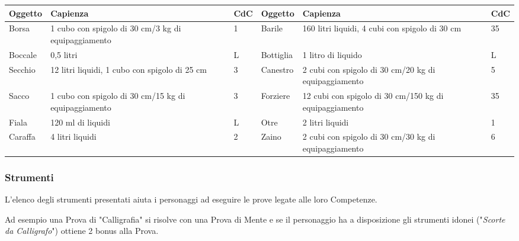 \documentclass[12pt,a4paper,twoside,openany]{book}
\begin{document}
\begin{tabularx}{0.95\textwidth}{lXl|lXl}
\textbf{Oggetto}&\textbf{Capienza}&\textbf{CdC}&\textbf{Oggetto}&\textbf{Capienza}&\textbf{CdC}\\
\toprule
Borsa&1 cubo con spigolo di 30 cm/3 kg di equipaggiamento&1&Barile&160 litri liquidi, 4 cubi con spigolo di 30 cm&35\\
Boccale&0,5 litri&L&Bottiglia&1 litro di liquido&L\\
Secchio&12 litri liquidi, 1 cubo con spigolo di 25 cm&3&Canestro&2 cubi con spigolo di 30 cm/20 kg di equipaggiamento&5\\
Sacco&1 cubo con spigolo di 30 cm/15 kg di equipaggiamento&3&Forziere&12 cubi con spigolo di 30 cm/150 kg di equipaggiamento&35\\
Fiala&120 ml di liquidi&L&Otre&2 litri liquidi&1\\
Caraffa&4 litri liquidi&2&Zaino&2 cubi con spigolo di 30 cm/30 kg di equipaggiamento&6\\
\end{tabularx}


\begin{multicols}{2}

\subsubsection{Strumenti}

L'elenco degli strumenti presentati aiuta i personaggi ad eseguire le prove legate alle loro Competenze.

Ad esempio una Prova di "Calligrafia" si risolve con una Prova di Mente e se il personaggio ha a disposizione gli strumenti idonei ("\textit{Scorte da Calligrafo}") ottiene 2 bonus alla Prova.

\end{multicols}

\medskip
\end{document}
